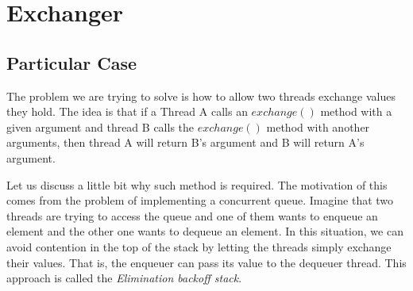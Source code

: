 \section{\textbf{Exchanger}}
\subsection{Particular Case}
\par
The problem we are trying to solve is how to allow two threads exchange values
they hold. The idea is that if a Thread A calls an $exchange()$ method with a given
argument and thread B calls the $exchange()$ method with another arguments, then
thread A will return B's argument and B will return A's argument.
\par
Let us discuss a little bit why such method is required. The motivation of this
comes from the problem of implementing a concurrent queue. Imagine that two
threads are trying to access the queue and one of them wants to enqueue an
element and the other one wants to dequeue an element. In this situation, we can
avoid contention in the top of the stack by letting the threads simply exchange
their values. That is, the enqueuer can pass its value to the dequeuer thread.
This approach is called the \textit{Elimination backoff stack}.
\par
